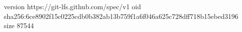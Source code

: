 version https://git-lfs.github.com/spec/v1
oid sha256:6ce8902f15c0225cdb0b382ab13b759f1a6f046a625c728dff718b15ebed3196
size 87544
